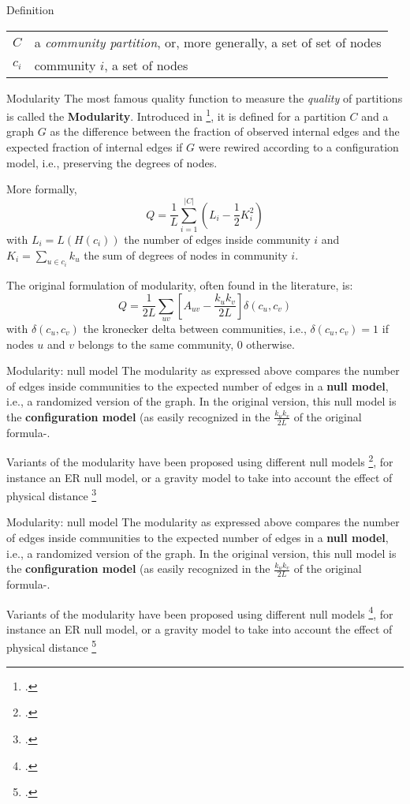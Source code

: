 \begin{textbox}{Definition}
\begin{tabular}{p{}|p{}}\scriptsize

$C$ & a \textit{community partition}, or, more generally, a set of set of nodes \\
$c_i$ & community $i$, a set of nodes \\
\end{tabular}
\end{textbox}


\begin{textbox}{Modularity}
The most famous quality function to measure the \textit{quality} of partitions is called the \textbf{Modularity}. Introduced in \footcite{girvan2002community}, it is defined for a partition $C$ and a graph $G$ as the difference between the fraction of observed internal edges and the expected fraction of internal edges if $G$ were rewired according to a configuration model, i.e., preserving the degrees of nodes.

More formally, 
\[
Q=\frac{1}{L}\sum_{i=1}^{|C|}(L_{i}-\frac{1}{2}K_i^2)
\]
with $L_{i}=L(H(c_i))$ the number of edges inside community $i$ and $K_i=\sum_{u \in c_i}k_u$ the sum of degrees of nodes in community $i$.

The original formulation of modularity, often found in the literature, is:
\[
Q=\frac{1}{2L}\sum_{uv}\left[ A_{uv}-\frac{k_uk_v}{2L}\right] \delta(c_u,c_v)
\]
with $\delta(c_u,c_v)$ the kronecker delta between communities, i.e., $\delta(c_u,c_v)=1$ if nodes $u$ and $v$ belongs to the same community, 0 otherwise.


\end{textbox}

\begin{textbox}{Modularity: null model}
The modularity as expressed above compares the number of edges inside communities to the expected number of edges in a \textbf{null model}, i.e., a randomized version of the graph. In the original version, this null model is the \textbf{configuration model} (as easily recognized in the $\frac{k_uk_v}{2L}$ of the original formula-.

Variants of the modularity have been proposed using different null models \footcite{jutla2011generalized}, for instance an ER null model, or a gravity model to take into account the effect of physical distance \footcite{expert2011uncovering}
\end{textbox}

\begin{textbox}{Modularity: null model}
The modularity as expressed above compares the number of edges inside communities to the expected number of edges in a \textbf{null model}, i.e., a randomized version of the graph. In the original version, this null model is the \textbf{configuration model} (as easily recognized in the $\frac{k_uk_v}{2L}$ of the original formula-.

Variants of the modularity have been proposed using different null models \footcite{jutla2011generalized}, for instance an ER null model, or a gravity model to take into account the effect of physical distance \footcite{expert2011uncovering}
\end{textbox}

